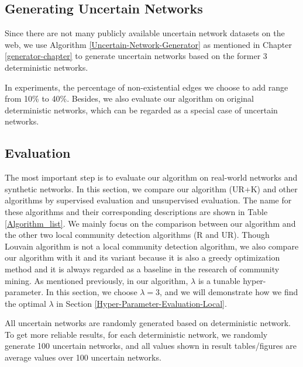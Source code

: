 \documentclass[\main/thesis.tex]{subfiles}
\begin{document}
\subsection*{Generating Uncertain Networks}
Since there are not many publicly available uncertain network datasets on the web, we use Algorithm \ref{Uncertain-Network-Generator} as mentioned in Chapter \ref{generator-chapter} to generate uncertain networks based on the former 3 deterministic networks. 

In experiments, the percentage of non-existential edges we choose to add range from 10\% to 40\%. Besides, we also evaluate our algorithm on original deterministic networks, which can be regarded as a special case of uncertain networks.

\subsection{Evaluation}
The most important step is to evaluate our algorithm on real-world networks and synthetic networks. In this section, we compare our algorithm (UR+K) and other algorithms by supervised evaluation and unsupervised evaluation. The name for these algorithms and their corresponding descriptions are shown in Table \ref{Algorithm_list}. We mainly focus on the comparison between our algorithm and the other two local community detection algorithms (R and UR). Though Louvain algorithm is not a local community detection algorithm, we also compare our algorithm with it and its variant because it is also a greedy optimization method and it is always regarded as a baseline in the research of community mining. As mentioned previously, in our algorithm, $\lambda$ is a tunable hyper-parameter. In this section, we choose $\lambda=3$, and we will demonstrate how we find the optimal $\lambda$ in Section \ref{Hyper-Parameter-Evaluation-Local}.

All uncertain networks are randomly generated based on deterministic network. To get more reliable results, for each deterministic network, we randomly generate 100 uncertain networks, and all values shown in result tables/figures are average values over 100 uncertain networks.
\end{document}
